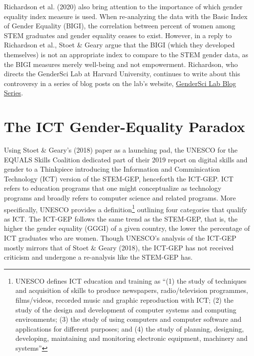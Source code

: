 \documentclass[]{book}
\begin{document}
Richardson et al. (2020) also bring attention to the importance of which
gender equality index measure is used. When re-analyzing the data with
the Basic Index of Gender Equality (BIGI), the correlation between
percent of women among STEM graduates and gender equality ceases to
exist. However, in a reply to Richardson et al., Stoet \& Geary
\citeyearpar{stoetGenderEqualityParadoxPart2020a} argue that the BIGI
(which they developed themselves) is not an appropriate index to compare
to the STEM gender data, as the BIGI measures merely well-being and not
empowerment. Richardson, who directs the GenderSci Lab at Harvard
University, continues to write about this controversy in a series of
blog posts on the lab's website,
\href{https://www.genderscilab.org/blog/the-gendersci-lab-takes-on-the-gender-equality-paradox-hypothesis-introduction-and-primer}{GenderSci
Lab Blog Series}.

\section{The ICT Gender-Equality
Paradox}\label{the-ict-gender-equality-paradox}

Using Stoet \& Geary's (2018) paper as a launching pad, the UNESCO for
the EQUALS Skills Coalition dedicated part of their 2019 report on
digital skills and gender \citep{westBlushIfCould2019a} to a Thinkpiece
introducing the Information and Comminication Technology (ICT) version
of the STEM-GEP, henceforth the ICT-GEP. ICT refers to education
programs that one might conceptualize as technology programs and broadly
refers to computer science and related programs. More specifically,
UNESCO provides a definition\footnote{UNESCO defines ICT education and
  training as ``(1) the study of techniques and acquisition of skills to
  produce newspapers, radio/television programmes, films/videos,
  recorded music and graphic reproduction with ICT; (2) the study of the
  design and development of computer systems and computing environments;
  (3) the study of using computers and computer software and
  applications for different purposes; and (4) the study of planning,
  designing, developing, maintaining and monitoring electronic
  equipment, machinery and systems''} outlining four categories that
qualify as ICT. The ICT-GEP follows the same trend as the STEM-GEP, that
is, the higher the gender equality (GGGI) of a given country, the lower
the percentage of ICT graduates who are women. Though UNESCO's analysis
of the ICT-GEP mostly mirrors that of Stoet \& Geary (2018), the ICT-GEP
has not received criticism and undergone a re-analysis like the STEM-GEP
has.
\end{document}
